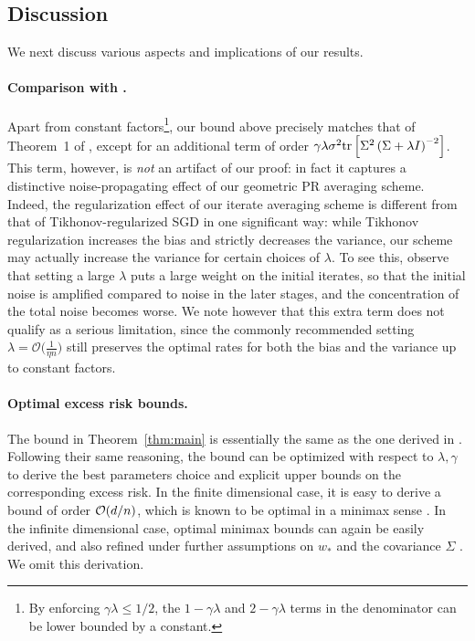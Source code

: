 \documentclass[final,12pt]{colt2018} %
\newcommand{\OO}{\mathcal{O}}
\newcommand{\trace}[1]{\mbox{\normalfont tr}\left[#1\right]}
\newcommand{\pa}[1]{\left(#1\right)}
\newcommand{\bpa}[1]{\bigl(#1\bigr)}
\begin{document}
\subsection{Discussion}\label{sec:discussion}
We  next  discuss various aspects and implications of our results. 
\paragraph{Comparison with \citet{DFB16}.} Apart from constant factors\footnote{By enforcing $\gamma\lambda \le 1/2$, the $1-\gamma\lambda$ 
and $2-\gamma\lambda$ terms in the denominator can be lower bounded by a constant.}, our bound above precisely matches that of Theorem~1 of 
\citet{DFB16}, except for an additional term of order $\gamma\lambda \sigma^2 \trace{\Sigma^2 \pa{\Sigma + \lambda I}^{-2}}$. This term, 
however, is \emph{not} an artifact of our proof: in fact it captures a distinctive noise-propagating effect of our geometric PR averaging 
scheme. 
Indeed,  the regularization effect of our iterate averaging scheme is different from that of Tikhonov-regularized SGD in one significant 
way: while Tikhonov regularization increases the 
bias and strictly decreases the variance, our scheme may actually increase the variance for certain choices of $\lambda$. To see this, 
observe that setting a large $\lambda$ puts a large weight on the initial iterates, so that the initial noise is amplified compared to 
noise 
in the later stages, and the concentration of the total noise becomes worse. We note however that this extra term does not qualify 
as a serious limitation, since the commonly recommended setting $\lambda = \OO\bpa{\frac{1}{\eta n}}$ still preserves the optimal rates 
for both the bias and the variance up to constant factors.

\paragraph{Optimal excess risk bounds.} 
The bound in Theorem~\ref{thm:main} is essentially the same as the one derived in  \citet[Theorem 2]{DFB16}.
Following their same reasoning,   the  bound  can be optimized with respect to $\lambda, \gamma$ to derive the best parameters choice and 
explicit upper bounds on the corresponding excess risk. In the finite dimensional case,  it is easy  to derive a bound of order ${\cal O} 
(d/n)$, which is known to be optimal in a minimax sense \citep{T08}. In the infinite dimensional case,  optimal  minimax bounds can again  
be easily derived,  and also refined  under further  assumptions on $w_*$ and the covariance $\Sigma$ \citep{DCR05,CD07}. We omit this 
derivation. 
\end{document}
